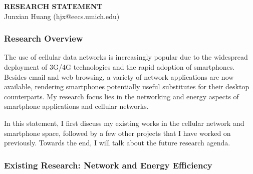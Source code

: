 \documentclass[10pt]{article}
\begin{document}
\begin{small}

\begin{center}
{\LARGE \bf RESEARCH STATEMENT}\\
\vspace*{0.1cm}
{\normalsize Junxian Huang (hjx@eecs.umich.edu)}
\end{center}



\subsubsection*{Research Overview}

The use of cellular data networks is increasingly popular due to the widespread deployment of 3G/4G technologies and the rapid adoption of smartphones. Besides email and web browsing, a variety of network applications are now available, rendering smartphones potentially useful substitutes for their desktop counterparts. My research focus lies in the networking and energy aspects of smartphone applications and cellular networks.

In this statement, I first discuss my existing works in the cellular network and smartphone space, followed by a few other projects that I have worked on previously. Towards the end, I will talk about the future research agenda.

\subsubsection*{Existing Research: Network and Energy Efficiency}


\end{small}
\end{document}
